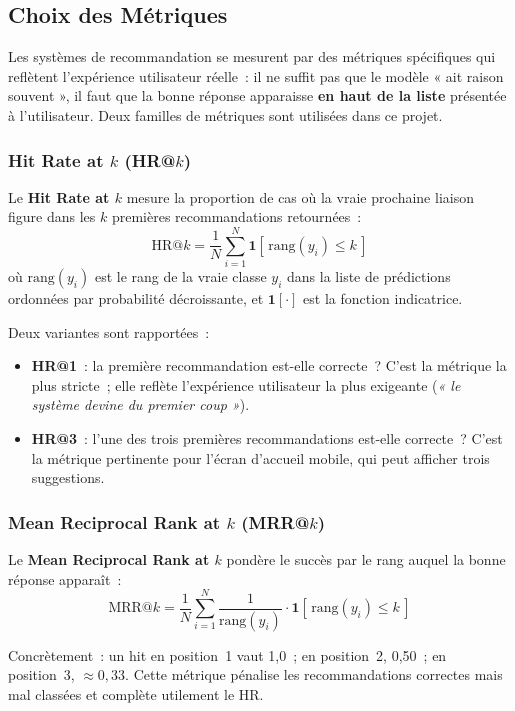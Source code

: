 \documentclass[11pt, a4paper]{article}
\begin{document}
\subsection{Choix des Métriques}

Les systèmes de recommandation se mesurent par des métriques
spécifiques qui reflètent l'expérience utilisateur réelle~: il ne
suffit pas que le modèle « ait raison souvent », il faut que la bonne
réponse apparaisse \textbf{en haut de la liste} présentée à
l'utilisateur. Deux familles de métriques sont utilisées dans ce
projet.

\subsubsection*{Hit Rate at $k$ (HR@$k$)}

Le \textbf{Hit Rate at $k$} mesure la proportion de cas où la vraie
prochaine liaison figure dans les $k$ premières recommandations
retournées~:
\[
\text{HR@}k = \frac{1}{N} \sum_{i=1}^{N}
  \mathbf{1}\!\left[\,\text{rang}(y_i) \leq k\,\right]
\]
où $\text{rang}(y_i)$ est le rang de la vraie classe $y_i$ dans la
liste de prédictions ordonnées par probabilité décroissante, et
$\mathbf{1}[\cdot]$ est la fonction indicatrice.

Deux variantes sont rapportées~:
\begin{itemize}
\item \textbf{HR@1}~: la première recommandation est-elle correcte~?
    C'est la métrique la plus stricte~; elle reflète l'expérience
    utilisateur la plus exigeante (\textit{« le système devine du premier
    coup »}).
\item \textbf{HR@3}~: l'une des trois premières recommandations
    est-elle correcte~? C'est la métrique pertinente pour l'écran
    d'accueil mobile, qui peut afficher trois suggestions.
\end{itemize}

\subsubsection*{Mean Reciprocal Rank at $k$ (MRR@$k$)}

Le \textbf{Mean Reciprocal Rank at $k$} pondère le succès par le rang
auquel la bonne réponse apparaît~:
\[
\text{MRR@}k = \frac{1}{N} \sum_{i=1}^{N}
  \frac{1}{\text{rang}(y_i)}
  \cdot \mathbf{1}\!\left[\,\text{rang}(y_i) \leq k\,\right]
\]

Concrètement~: un hit en position~1 vaut 1{,}0~; en position~2,
0{,}50~; en position~3, $\approx 0{,}33$. Cette métrique pénalise les
recommandations correctes mais mal classées et complète utilement le
HR.
\end{document}
